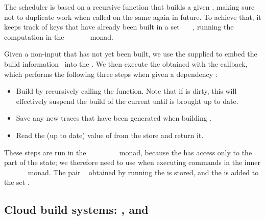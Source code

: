 The  scheduler is based on a recursive function  that
builds a given , making sure not to duplicate work when called on the
same  again in future. To achieve that, it keeps track of keys that have
already been built in a set ~\hs{::}~~, running the
computation in the
~~~~~~ monad.

Given a non-input  that has not yet been built, we use the supplied
 to embed the build information~ into the .
We then execute the obtained  with the  callback, which
performs the following three steps when given a dependency :

\begin{itemize}
    \item Build  by recursively calling the  function. Note
          that if  is dirty, this will effectively suspend the build of
          the current  until  is brought up to date.
    \item Save any new traces that have been generated when building .
    \item Read the (up to date) value of  from the store and return it.
\end{itemize}

These steps are run in the
~~~~~~~~
monad, because the  has access only to the~ part of the state;
we therefore need to use  when executing commands in the inner
~~~~~~ monad.
The pair ~ obtained by running the  is
stored, and the  is added to the set .

\subsection{Cloud build systems: \Bazel, \CloudBuild and \Cloud \Shake}\label{sec-implementation-cloud}

